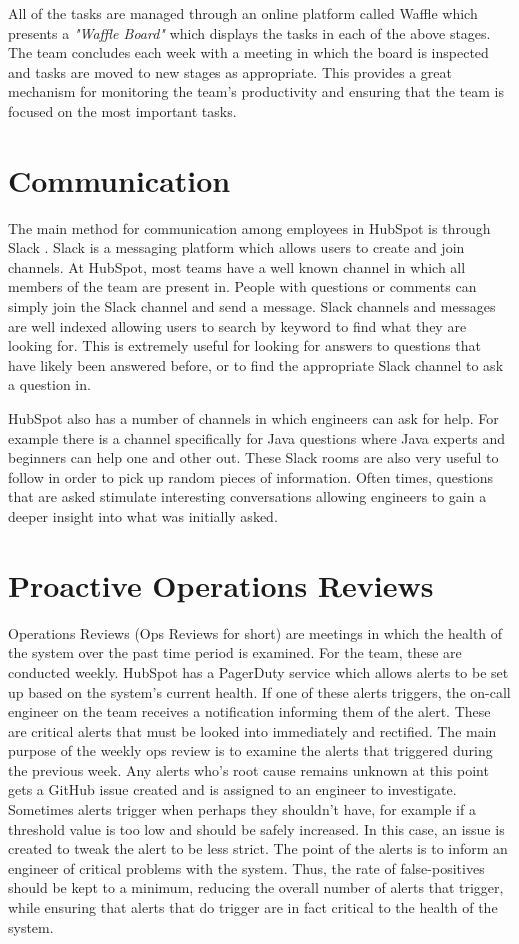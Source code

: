 All of the tasks are managed through an online platform called Waffle\cite{waffle} which presents a \textit{"Waffle Board"} which displays the tasks in each of the above stages. The team concludes each week with a meeting in which the board is inspected and tasks are moved to new stages as appropriate. This provides a great mechanism for monitoring the team's productivity and ensuring that the team is focused on the most important tasks. 

\section{Communication}
The main method for communication among employees in HubSpot is through Slack \cite{slack}. Slack is a messaging platform which allows users to create and join channels. At HubSpot, most teams have a well known channel in which all members of the team are present in. People with questions or comments can simply join the Slack channel and send a message. Slack channels and messages are well indexed allowing users to search by keyword to find what they are looking for. This is extremely useful for looking for answers to questions that have likely been answered before, or to find the appropriate Slack channel to ask a question in.

HubSpot also has a number of channels in which engineers can ask for help. For example there is a channel specifically for Java questions where Java experts and beginners can help one and other out. These Slack rooms are also very useful to follow in order to pick up random pieces of information. Often times, questions that are asked stimulate interesting conversations allowing engineers to gain a deeper insight into what was initially asked.

\section{Proactive Operations Reviews}
Operations Reviews (Ops Reviews for short) are meetings in which the health of the system over the past time period is examined. For the \team{} team, these are conducted weekly. HubSpot has a PagerDuty service which allows alerts to be set up based on the system's current health. If one of these alerts triggers, the on-call engineer on the team receives a notification informing them of the alert. These are critical alerts that must be looked into immediately and rectified. The main purpose of the weekly ops review is to examine the alerts that triggered during the previous week. Any alerts who's root cause remains unknown at this point gets a GitHub issue created and is assigned to an engineer to investigate. Sometimes alerts trigger when perhaps they shouldn't have, for example if a threshold value is too low and should be safely increased. In this case, an issue is created to tweak the alert to be less strict. The point of the alerts is to inform an engineer of critical problems with the system. Thus, the rate of false-positives should be kept to a minimum, reducing the overall number of alerts that trigger, while ensuring that alerts that do trigger are in fact critical to the health of the system.

